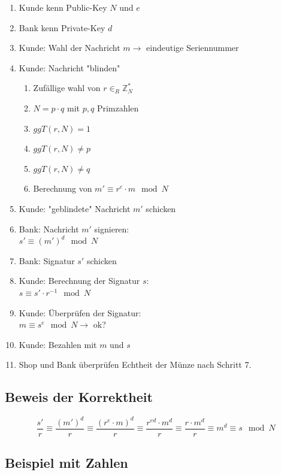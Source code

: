\documentclass[12pt]{scrartcl}
\begin{document}
\begin{enumerate}
    \item Kunde kenn Public-Key $N$ und $e$
    \item Bank kenn Private-Key $d$
    \item Kunde: Wahl der Nachricht $m \rightarrow$ eindeutige Seriennummer
    \item Kunde: Nachricht "blinden"\text{:}
    \begin{enumerate}
        \item Zufällige wahl von $r \in_R \mathbb{Z}^*_N$
        \item $N = p \cdot q$ mit $p,q$ Primzahlen
        \item $ggT(r,N) = 1$
        \item $ggT(r,N) \neq p$
        \item $ggT(r,N) \neq q$
        \item Berechnung von $m' \equiv r^e \cdot m \mod N$
    \end{enumerate} 
    \item Kunde: "geblindete" Nachricht $m'$ schicken
    \item Bank: Nachricht $m'$ signieren:\\
    $s' \equiv (m')^d \mod N$
    \item Bank: Signatur $s'$ schicken
    \item Kunde: Berechnung der Signatur $s$:\\
    $s \equiv s' \cdot r^{-1} \mod N$
    \item Kunde: Überprüfen der Signatur:\\
    $m \equiv s^e \mod N \rightarrow$ ok?
    \item Kunde: Bezahlen mit $m$ und $s$
    \item Shop und Bank überprüfen Echtheit der Münze nach Schritt 7.
\end{enumerate}


\subsection{Beweis der Korrektheit}

\begin{equation*}
    \frac{s'}{r} \equiv \frac{(m')^d}{r} \equiv \frac{(r^e \cdot m)^d}{r} \equiv \frac{r^{ed} \cdot m^d}{r} \equiv \frac{r \cdot m^d}{r} \equiv m^d \equiv s \mod N
\end{equation*}


\newpage
\subsection{Beispiel mit Zahlen}
\end{document}
